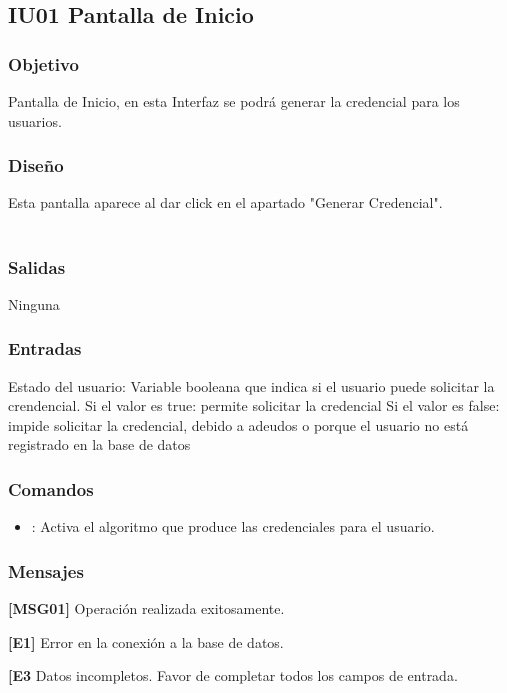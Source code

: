 \newpage
\subsection{IU01 Pantalla de Inicio}

\subsubsection{Objetivo}
	Pantalla de Inicio, en esta Interfaz se podrá generar la credencial para los usuarios.

\subsubsection{Diseño}
	Esta pantalla aparece al dar click en el apartado "Generar Credencial".  \\\\


\subsubsection{Salidas}
	\begin{Citemize}
		\item Ninguna
	\end{Citemize}
	
\subsubsection{Entradas}
	\begin{Citemize}
		\item Estado del usuario: Variable booleana que indica si el usuario puede solicitar la crendencial. 
		Si el valor es true: permite solicitar la credencial
		Si el valor es false: impide solicitar la credencial, debido a adeudos o porque el usuario no está registrado en la 				base de datos
	\end{Citemize}

\subsubsection{Comandos}
\begin{itemize}
	\item {}: Activa el algoritmo que produce las credenciales para el usuario.
\end{itemize}

\subsubsection{Mensajes}
	\begin{Citemize}
		\item {\bf [MSG01]} Operación realizada exitosamente. 
		\item {\bf [E1]} Error en la conexión a la base de datos.
		\item {\bf [E3} Datos incompletos. Favor de completar todos los campos de entrada.
	\end{Citemize}